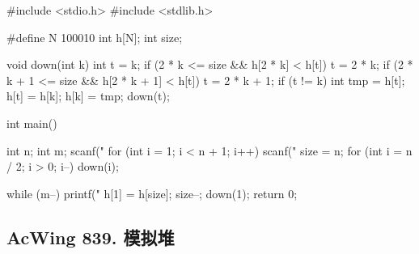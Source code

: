\begin{mycpptwocol}[堆排序]
#include <stdio.h>
#include <stdlib.h>

#define N 100010
int h[N];
int size;

void down(int k)
{
    int t = k;
    if (2 * k <= size && h[2 * k] < h[t]) {
        t = 2 * k;
    }
    if (2 * k + 1 <= size && h[2 * k + 1] < h[t]) {
        t = 2 * k + 1;
    }
    if (t != k) {
        int tmp = h[t];
        h[t] = h[k];
        h[k] = tmp;
        down(t);
    }
}

int main()
{
    int n;
    int m;
    scanf("%
    for (int i = 1; i < n + 1; i++) {
        scanf("%
    }
    size = n;
    for (int i = n / 2; i > 0; i--) {
        down(i);
    }
    
    while (m--) {
        printf("%
        h[1] = h[size];
        size--;
        down(1);
    }
    return 0;
}
\end{mycpptwocol}

\subsection{AcWing 839. 模拟堆}

